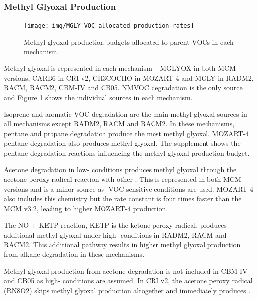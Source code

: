 \subsubsection{Methyl Glyoxal Production} \label{sss:mglyox}

\begin{figure}
    \centering
    \texttt{[image: img/MGLY\_VOC\_allocated\_production\_rates]}
    \vspace{0mm}
    \caption{Methyl glyoxal production budgets allocated to parent VOCs in each mechanism.}
    \vspace{-4mm}
    \label{f:mglyox_budgets} 
\end{figure} 

Methyl glyoxal is represented in each mechanism -- MGLYOX in both MCM versions, CARB6 in CRI v2, CH3COCHO in MOZART-4 and MGLY in RADM2, RACM, RACM2, CBM-IV and CB05.
NMVOC degradation is the only source and Figure \ref{f:mglyox_budgets} shows the individual sources in each mechanism.

Isoprene and aromatic VOC degradation are the main methyl glyoxal sources in all mechanisms except RADM2, RACM and RACM2.
In these mechanisms, pentane and propane degradation produce the most methyl glyoxal.
MOZART-4 pentane degradation also produces methyl glyoxal.
The supplement shows the pentane degradation reactions influencing the methyl glyoxal production budget.

Acetone degradation in low- conditions produces methyl glyoxal through the acetone peroxy radical reaction with other  \citep{Fu:2008}.
This is represented in both MCM versions and is a minor source as -VOC-sensitive conditions are used.  
MOZART-4 also includes this chemistry but the rate constant is four times faster than the MCM v3.2, leading to higher MOZART-4 production.

The NO + KETP reaction, KETP is the ketone peroxy radical, produces additional methyl glyoxal under high- conditions in RADM2, RACM and RACM2.
This additional pathway results in higher methyl glyoxal production from alkane degradation in these mechanisms.

Methyl glyoxal production from acetone degradation is not included in CBM-IV and CB05 as high- conditions are assumed.
In CRI v2, the acetone peroxy radical (RN8O2) skips methyl glyoxal production altogether and immediately produces .
